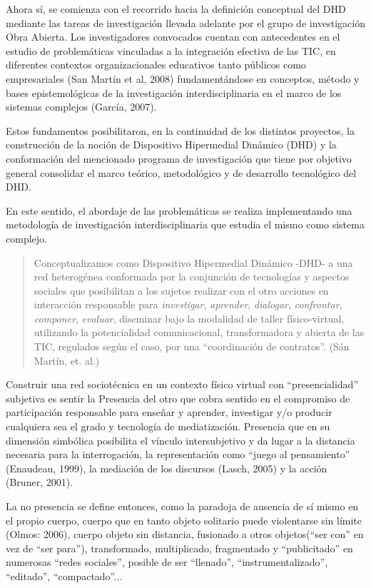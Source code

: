 Ahora sí, se comienza con el recorrido hacia la definición conceptual del DHD
mediante las tareas de investigación llevada adelante por el grupo de
investigación Obra Abierta. Los investigadores convocados cuentan con
antecedentes en el estudio de problemáticas vinculadas a la integración efectiva
de las TIC, en diferentes contextos organizacionales educativos tanto públicos
como empresariales (San Martín et al, 2008) fundamentándose en conceptos, método
y bases epistemológicas de la investigación interdisciplinaria en el marco de
los sistemas complejos (García, 2007).

Estos fundamentos posibilitaron, en la continuidad de los distintos proyectos,
la construcción de la noción de Dispositivo Hipermedial Dinámico (DHD) y la
conformación del mencionado programa de investigación que tiene por objetivo
general consolidar el marco teórico, metodológico y de desarrollo tecnológico
del DHD.

En este sentido, el abordaje de las problemáticas se realiza implementando una
metodología de investigación interdisciplinaria que estudia el mismo como
sistema complejo.

\begin{quote} \label{definiciondhd}

Conceptualizamos como Dispositivo Hipermedial Dinámico -DHD- a una red
heterogénea conformada por la conjunción de tecnologías y aspectos sociales que
posibilitan a los sujetos realizar con el otro acciones en interacción
responsable para \textit{investigar}, \textit{aprender}, \textit{dialogar},
\textit{confrontar}, \textit{componer}, \textit{evaluar}, diseminar bajo la
modalidad de taller físico-virtual, utilizando la potencialidad comunicacional,
transformadora y abierta de las TIC, regulados según el caso, por una
“coordinación de contratos”. (Sán Martín, et. al.)
\end{quote} 

Construir una red sociotécnica en un contexto físico virtual con
“presencialidad” subjetiva es sentir la Presencia del otro que cobra sentido
en el compromiso de participación responsable para enseñar y aprender,
investigar y/o   producir  cualquiera    sea   el   grado    y   tecnología
de mediatización. Presencia que en su dimensión simbólica posibilita el vínculo 
intersubjetivo y da lugar a la distancia necesaria para la interrogación,
la representación como “juego al pensamiento” (Enaudeau, 1999), la mediación de
los  discursos (Lasch, 2005) y la acción (Bruner, 2001).

La no presencia se define entonces, como la paradoja de ausencia de sí mismo
en el propio cuerpo, cuerpo que en tanto objeto solitario puede violentarse sin
límite (Olmos: 2006), cuerpo objeto sin distancia, fusionado a otros
objetos(“ser con” en vez de “ser para”), transformado, multiplicado, fragmentado
y “publicitado” en numerosas “redes sociales”, posible de ser “llenado”,
“instrumentalizado”, “editado”, “compactado”...

